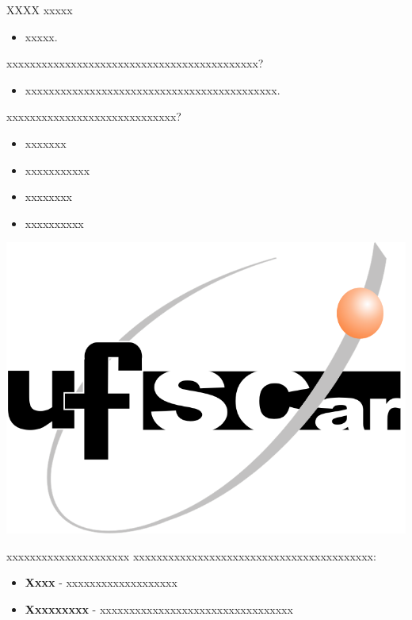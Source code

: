 \documentclass[xcolor=x11names,compress]{beamer}
\renewcommand{\(}{\begin{columns}}
\renewcommand{\)}{\end{columns}}
\newcommand{\<}[1]{\begin{column}{#1}}
\renewcommand{\>}{\end{column}}
\begin{document}
\begin{frame}{XXXX}
xxxxx
\begin{itemize}
    \item xxxxx.
\end{itemize}

\pause

xxxxxxxxxxxxxxxxxxxxxxxxxxxxxxxxxxxxxxxxxxx?
\begin{itemize}
    \item xxxxxxxxxxxxxxxxxxxxxxxxxxxxxxxxxxxxxxxxxxx.
\end{itemize}

\pause

xxxxxxxxxxxxxxxxxxxxxxxxxxxxx?
\begin{itemize}
    \item xxxxxxx
    \item xxxxxxxxxxx
    \item xxxxxxxx
    \item xxxxxxxxxx
\end{itemize}
\end{frame}

\begin{frame}
    \centerline{\noindent\includegraphics[width=0.8\linewidth]{ufscar.png}}
\end{frame}

\begin{frame}{xxxxxxxxxxxxxxxxxxxxx}
xxxxxxxxxxxxxxxxxxxxxxxxxxxxxxxxxxxxxxxxx:\\
\begin{itemize}
    \item \textbf{Xxxx} - xxxxxxxxxxxxxxxxxxx
    \item \textbf{Xxxxxxxxx} - xxxxxxxxxxxxxxxxxxxxxxxxxxxxxxxxx
\end{itemize}
\end{frame}
\end{document}
